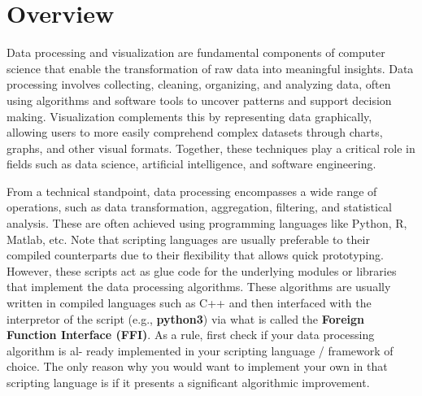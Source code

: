 \section{Overview}

Data processing and visualization are fundamental components of computer science
that enable the transformation of raw data into meaningful insights. Data
processing involves collecting, cleaning, organizing, and analyzing data, often
using algorithms and software tools to uncover patterns and support decision
making. Visualization complements this by representing data graphically,
allowing users to more easily comprehend complex datasets through charts,
graphs, and other visual formats. Together, these techniques play a critical
role in ﬁelds such as data science, artiﬁcial intelligence, and software
engineering.

From a technical standpoint, data processing encompasses a wide range of
operations, such as data transformation, aggregation, ﬁltering, and statistical
analysis. These are often achieved using programming languages like Python,
R, Matlab, etc. Note that scripting languages are usually preferable to their
compiled counterparts due to their ﬂexibility that allows quick prototyping.
However, these scripts act as glue code for the underlying modules or libraries
that implement the data processing algorithms. These algorithms are usually
written in compiled languages such as C++ and then interfaced with the
interpretor of the script (e.g., \textbf{python3}) via what is called the
\textbf{Foreign Function Interface (FFI)}. As a rule, ﬁrst check if your data
processing algorithm is al- ready implemented in your scripting language /
framework of choice. The only reason why you would want to implement your own in
that scripting language is if it presents a signiﬁcant algorithmic improvement.
